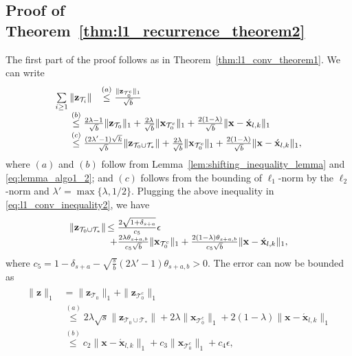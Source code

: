 \documentclass[journal]{IEEEtran}
\newcommand{\mbx}{\mathbf{x}}
\newcommand{\mbz}{\mathbf{z}}
\newcommand{\T}{\mathcal{T}}
\begin{document}
\subsection{Proof of Theorem~\ref{thm:l1_recurrence_theorem2}}
The first part of the proof follows as in Theorem~\ref{thm:l1_conv_theorem1}. We can write
\begin{eqnarray*}
\label{eq:l1_recurrence_inequality1}
\begin{array}{rl}
\sum\limits_{i \geq 1} \|\mbz_{\T_i}\| & \stackrel{(a)}{\leq}  \frac{\|\mbz_{\T_0^c}\|_1}{\sqrt{b}} \\ 
& \hspace{-11mm} \stackrel{(b)}{\leq} \frac{2 \lambda -1}{\sqrt{b}}\|\mbz_{\T_0}\|_1 + \frac{2\lambda}{\sqrt{b}}\|\mbx_{\T_0^c}\|_1 + \frac{2(1-\lambda)}{\sqrt{b}}\|\mbx  - \acute{\mbx}_{l,k}\|_1 \\
& \hspace{-11mm} \stackrel{(c)}{\leq} \frac{(2 \lambda' -1)\sqrt{k}}{\sqrt{b}}\|\mbz_{\T_0 \cup \T_*}\| + \frac{2\lambda}{\sqrt{b}}\|\mbx_{\T_0^c}\|_1 + \frac{2(1-\lambda)}{\sqrt{b}}\|\mbx  - \acute{\mbx}_{l,k}\|_1,
\end{array}
\end{eqnarray*}
where $(a)$ and $(b)$ follow from Lemma~\ref{lem:shifting_inequality_lemma} and \eqref{eq:lemma_algo1_2}; and $(c)$ follows from the bounding of $\ell_1$-norm by the $\ell_2$-norm and $\lambda' = \max\{\lambda,1/2\}$. Plugging the above inequality in  \eqref{eq:l1_conv_inequality2}, we have
\begin{eqnarray}
\label{eq:l1_recurrence_inequality2}
\begin{array}{rl}
\|\mbz_{\T_0 \cup \T_*}\|  & \hspace{-3mm}\leq  \frac{2\sqrt{1+\delta_{s+a}}}{c_5} \epsilon \\ 
& \hspace{-2mm}+ \frac{2 \lambda \theta_{s+a,b}}{c_5 \sqrt{b}} \|\mbx_{\T_0^c}\|_1 + \frac{2(1-\lambda)\theta_{s+a,b}}{c_5 \sqrt{b}}\|\mbx  - \acute{\mbx}_{l,k}\|_1,
\end{array}
\end{eqnarray}
where $c_5 = 1-\delta_{s+a}-\sqrt{\frac{s}{b}} (2\lambda' -1)\theta_{s+a,b} > 0$. The error can now be bounded as
\begin{eqnarray*}
\begin{array}{rl}
\|\mbz\|_1 & = \|\mbz_{\T_0}\|_1 + \|\mbz_{\T_0^c}\|_1 \\
& \stackrel{(a)}{\leq} 2\lambda \sqrt{s}\|\mbz_{\T_0 \cup \T_*}\| + 2\lambda\|\mbx_{\T_0^c}\|_1 + 2(1-\lambda)\|\mbx  - \acute{\mbx}_{l,k}\|_1 \\
& \stackrel{(b)}{\leq} c_2 \|\mbx  - \acute{\mbx}_{l,k}\|_1 + c_3 \|\mbx_{\T_0^c}\|_1 + c_4 \epsilon,
\end{array}
\end{eqnarray*}
\end{document}

